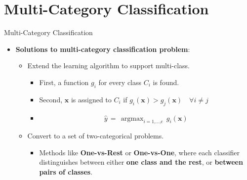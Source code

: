 \documentclass[serif, aspectratio=169]{beamer}
\DeclareMathOperator*{\argmax}{argmax}
\begin{document}
    \section{Multi-Category Classification}

    \begin{frame}{Multi-Category Classification}
        \begin{itemize}
            \item \textbf{Solutions to multi-category classification problem}:
            \medskip
            \begin{itemize}\itemsep1.5em
            \item Extend the learning algorithm to support multi-class.
            \medskip
            \begin{itemize}\itemsep1em
            \item First, a function \(g_i\) for every class \(C_i\) is found.
            \item Second, \(\mathbf{x}\) is assigned to \(C_i\) if \(g_i(\mathbf{x}) > g_j(\mathbf{x}) \quad \forall i \neq j\)
            \item[] \[\hat{y} \, = \, \argmax_{i=\text{1,...,c}} \, g_i(\mathbf{x})\]
            \end{itemize}
            \item Convert to a set of two-categorical problems.
            \medskip
            \begin{itemize}
                \item Methods like \textbf{One-vs-Rest} or \textbf{One-vs-One}, where each classifier distinguishes between either \textbf{one class and the rest}, or \textbf{between pairs of classes}.
            \end{itemize}
            \end{itemize}
        \end{itemize}
    \end{frame}
\end{document}
